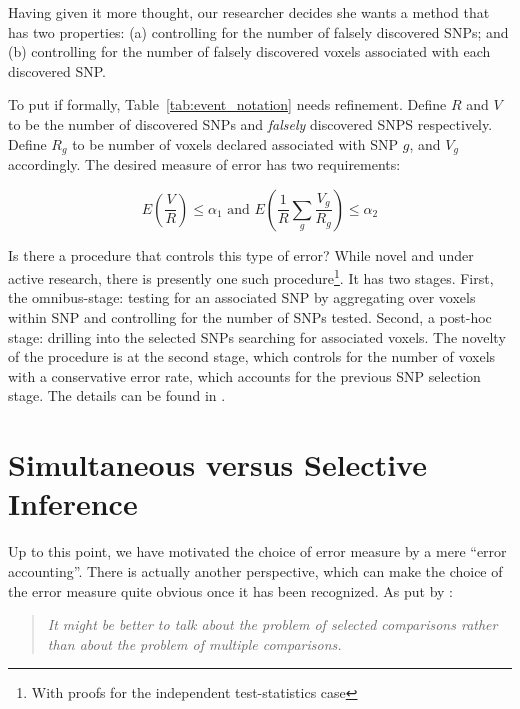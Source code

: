 \documentclass[review,12pt]{article}
\theoremstyle{definition}
\theoremstyle{definition}
\begin{document}
Having given it more thought, our researcher decides she wants a method that has two properties: 
(a) controlling for the number of falsely discovered SNPs; and 
(b) controlling for the number of falsely discovered voxels associated with each discovered SNP. 

To put if formally, Table~\ref{tab:event_notation} needs refinement. 
Define $R$ and $V$ to be the number of discovered SNPs and \emph{falsely} discovered SNPS respectively. 
Define $R_g$ to be number of voxels declared associated with SNP $g$, and $V_g$ accordingly. The desired measure of error has two requirements: 

\begin{equation} \label{eq:hirarchial_error}
 E \left(\frac{V}{R} \right)\leq \alpha_1 
\text{ and } 
E \left( \frac{1}{R}\sum_{g} \frac{V_{g}}{R_{g}} \right)\leq \alpha_2
\end{equation}


Is there a procedure that controls this type of error? While novel and under active research, there is presently one such procedure\footnote{ With proofs for the independent test-statistics case}. It has two stages. 
First, the omnibus-stage:  testing for an associated SNP by aggregating over voxels within SNP and controlling for the number of SNPs tested. Second, a post-hoc stage: drilling into the selected SNPs searching for associated voxels. The novelty of the procedure is at the second stage, which controls for the number of voxels with a conservative error rate, which accounts for the previous SNP selection stage. 
The details can be found in \cite{benjamini_adjusting_2013}.




\section{Simultaneous versus Selective Inference}
Up to this point, we have motivated the choice of error measure by a mere ``error accounting''. 
There is actually another perspective, which can make the choice of the error measure quite obvious once it has been recognized. As put by \citet{cox_remark_1965}:
\begin{quote}\em
It might be better to talk about the problem of selected comparisons rather than about the problem of multiple comparisons.
\end{quote}
\end{document}

